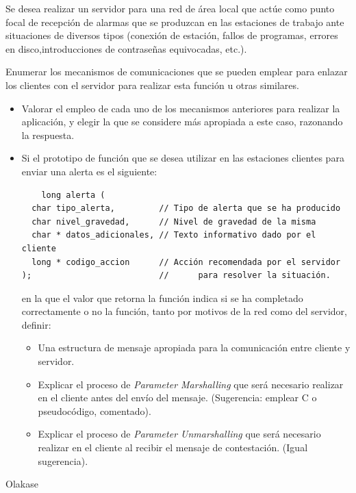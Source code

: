       
  \begin{problem}
  Se desea realizar un servidor para una red de área local que actúe como
punto focal de recepción de alarmas que se produzcan en las estaciones de
trabajo ante situaciones de diversos tipos (conexión de estación, fallos de
programas, errores en disco,introducciones de contraseñas equivocadas, etc.).

    Enumerar los mecanismos de comunicaciones que se pueden emplear para
enlazar los clientes con el servidor para realizar esta función u otras
similares.
\begin{itemize}
    \item Valorar el empleo de cada uno de los mecanismos anteriores para realizar la
aplicación, y elegir la que se considere más apropiada a este caso, razonando
la respuesta.
    \item Si el prototipo de función que se desea utilizar en las estaciones clientes
para enviar una alerta es el siguiente:
    \begin{verbatim}
    long alerta (
  char tipo_alerta,         // Tipo de alerta que se ha producido
  char nivel_gravedad,      // Nivel de gravedad de la misma
  char * datos_adicionales, // Texto informativo dado por el cliente
  long * codigo_accion      // Acción recomendada por el servidor
);                          //      para resolver la situación.
\end{verbatim}
    en la que el valor que retorna la función indica si se ha completado
correctamente o no la función, tanto por motivos de la red como del servidor,
definir:
    \begin{itemize}
      \item Una estructura de mensaje apropiada para la comunicación entre cliente y
servidor.
      \item Explicar el proceso de \textit{Parameter Marshalling} que será necesario
realizar en el cliente antes del envío del mensaje. (Sugerencia: emplear C o
pseudocódigo, comentado).
      \item Explicar el proceso de \textit{Parameter Unmarshalling} que será necesario
realizar en el cliente al recibir el mensaje de contestación. (Igual sugerencia).
    \end{itemize}
    \end{itemize}
      \solution

      Olakase

      \end{problem}

